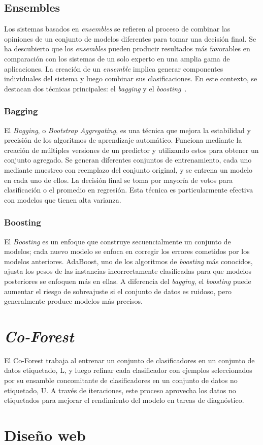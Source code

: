 \subsection{Ensembles}
Los sistemas basados en \textit{ensembles} se refieren al proceso de combinar las opiniones de un conjunto de modelos diferentes para tomar una decisión final. Se ha descubierto que los \textit{ensembles} pueden producir resultados más favorables en comparación con los sistemas de un solo experto en una amplia gama de aplicaciones. La creación de un \textit{ensemble} implica generar componentes individuales del sistema y luego combinar sus clasificaciones. En este contexto, se destacan dos técnicas principales: el \textit{bagging} y el \textit{boosting}~\cite{ensembles}.

\subsubsection{Bagging}
El \textit{Bagging}, o \textit{Bootstrap Aggregating}, es una técnica que mejora la estabilidad y precisión de los algoritmos de aprendizaje automático. Funciona mediante la creación de múltiples versiones de un predictor y utilizando estos para obtener un conjunto agregado. Se generan diferentes conjuntos de entrenamiento, cada uno mediante muestreo con reemplazo del conjunto original, y se entrena un modelo en cada uno de ellos. La decisión final se toma por mayoría de votos para clasificación o el promedio en regresión. Esta técnica es particularmente efectiva con modelos que tienen alta varianza.

\subsubsection{Boosting}
El \textit{Boosting} es un enfoque que construye secuencialmente un conjunto de modelos; cada nuevo modelo se enfoca en corregir los errores cometidos por los modelos anteriores. AdaBoost, uno de los algoritmos de \textit{boosting} más conocidos, ajusta los pesos de las instancias incorrectamente clasificadas para que modelos posteriores se enfoquen más en ellas. A diferencia del \textit{bagging}, el \textit{boosting} puede aumentar el riesgo de sobreajuste si el conjunto de datos es ruidoso, pero generalmente produce modelos más precisos.

\section{\textit{Co-Forest}}
El Co-Forest trabaja al entrenar un conjunto de clasificadores en un conjunto de datos etiquetado, L, y luego refinar cada clasificador con ejemplos seleccionados por su ensamble concomitante de clasificadores en un conjunto de datos no etiquetado, U. A través de iteraciones, este proceso aprovecha los datos no etiquetados para mejorar el rendimiento del modelo en tareas de diagnóstico.


\cite{IEEE:CoForest}

\section{Diseño web}




